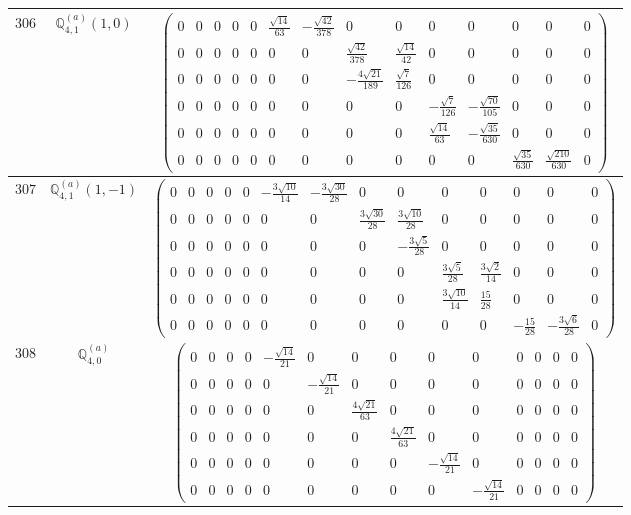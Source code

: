 \documentclass[fleqn,8pt,landscape]{jsarticle}
\begin{document}
\begin{center}
\begin{longtable}{ccc}
$ 306 $ & $ \mathbb{Q}_{4,1}^{(a)}(1,0) $ & $ \begin{pmatrix} 0 & 0 & 0 & 0 & 0 & \frac{\sqrt{14}}{63} & - \frac{\sqrt{42}}{378} & 0 & 0 & 0 & 0 & 0 & 0 & 0 \\ 0 & 0 & 0 & 0 & 0 & 0 & 0 & \frac{\sqrt{42}}{378} & \frac{\sqrt{14}}{42} & 0 & 0 & 0 & 0 & 0 \\ 0 & 0 & 0 & 0 & 0 & 0 & 0 & - \frac{4 \sqrt{21}}{189} & \frac{\sqrt{7}}{126} & 0 & 0 & 0 & 0 & 0 \\ 0 & 0 & 0 & 0 & 0 & 0 & 0 & 0 & 0 & - \frac{\sqrt{7}}{126} & - \frac{\sqrt{70}}{105} & 0 & 0 & 0 \\ 0 & 0 & 0 & 0 & 0 & 0 & 0 & 0 & 0 & \frac{\sqrt{14}}{63} & - \frac{\sqrt{35}}{630} & 0 & 0 & 0 \\ 0 & 0 & 0 & 0 & 0 & 0 & 0 & 0 & 0 & 0 & 0 & \frac{\sqrt{35}}{630} & \frac{\sqrt{210}}{630} & 0 \end{pmatrix} $ \\ \hline
$ 307 $ & $ \mathbb{Q}_{4,1}^{(a)}(1,-1) $ & $ \begin{pmatrix} 0 & 0 & 0 & 0 & 0 & - \frac{3 \sqrt{10}}{14} & - \frac{3 \sqrt{30}}{28} & 0 & 0 & 0 & 0 & 0 & 0 & 0 \\ 0 & 0 & 0 & 0 & 0 & 0 & 0 & \frac{3 \sqrt{30}}{28} & \frac{3 \sqrt{10}}{28} & 0 & 0 & 0 & 0 & 0 \\ 0 & 0 & 0 & 0 & 0 & 0 & 0 & 0 & - \frac{3 \sqrt{5}}{28} & 0 & 0 & 0 & 0 & 0 \\ 0 & 0 & 0 & 0 & 0 & 0 & 0 & 0 & 0 & \frac{3 \sqrt{5}}{28} & \frac{3 \sqrt{2}}{14} & 0 & 0 & 0 \\ 0 & 0 & 0 & 0 & 0 & 0 & 0 & 0 & 0 & \frac{3 \sqrt{10}}{14} & \frac{15}{28} & 0 & 0 & 0 \\ 0 & 0 & 0 & 0 & 0 & 0 & 0 & 0 & 0 & 0 & 0 & - \frac{15}{28} & - \frac{3 \sqrt{6}}{28} & 0 \end{pmatrix} $ \\ \hline
$ 308 $ & $ \mathbb{Q}_{4,0}^{(a)} $ & $ \begin{pmatrix} 0 & 0 & 0 & 0 & - \frac{\sqrt{14}}{21} & 0 & 0 & 0 & 0 & 0 & 0 & 0 & 0 & 0 \\ 0 & 0 & 0 & 0 & 0 & - \frac{\sqrt{14}}{21} & 0 & 0 & 0 & 0 & 0 & 0 & 0 & 0 \\ 0 & 0 & 0 & 0 & 0 & 0 & \frac{4 \sqrt{21}}{63} & 0 & 0 & 0 & 0 & 0 & 0 & 0 \\ 0 & 0 & 0 & 0 & 0 & 0 & 0 & \frac{4 \sqrt{21}}{63} & 0 & 0 & 0 & 0 & 0 & 0 \\ 0 & 0 & 0 & 0 & 0 & 0 & 0 & 0 & - \frac{\sqrt{14}}{21} & 0 & 0 & 0 & 0 & 0 \\ 0 & 0 & 0 & 0 & 0 & 0 & 0 & 0 & 0 & - \frac{\sqrt{14}}{21} & 0 & 0 & 0 & 0 \end{pmatrix} $ \\ \hline

\end{longtable}
\end{center}
\end{document}
